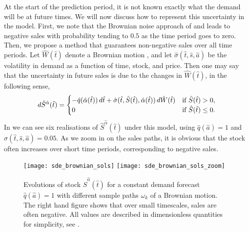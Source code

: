 \documentclass[main.tex]{subfiles}
\begin{document}
At the start of the prediction period, it is not known exactly what
the demand will be at future times. We will now discuss how to
represent this uncertainty in the model. First, we note that the Brownian noise
approach of \citet{raman1995optimal} and \citet{wu2016dynamic} leads to negative
sales with probability tending to $0.5$ as the time period goes to zero.
Then, we propose a method that guarantees non-negative sales over all
time periods.
Let $\hat{W}(\hat{t})$ denote a Brownian motion
\citep{oksendal2000stochastic}, and let
$\hat{\sigma}(\hat{t},\hat{s},\hat{a})$ be the volatility
in demand as a function of time, stock, and price. Then
one may say that the uncertainty in future
sales is due to the changes in $\hat{W}(\hat{t})$, in the following sense,
\begin{equation}\label{eq:brownian_noise}
  d\hat{S}^{\hat{\alpha}}(\hat{t}) =
  \begin{cases}
    -\hat{q}(\hat{\alpha}(\hat{t}))\,d\hat{t} +
    \hat{\sigma}(\hat{t},\hat{S}(\hat{t}),\hat{\alpha}(\hat{t}))\,d\hat{W}(\hat{t})
    & \textnormal{if } \hat{S}(\hat{t})>0,\\
    0 &  \textnormal{if } \hat{S}(\hat{t})\leq0.
  \end{cases}
\end{equation}
In  we can see six realisations of
$\hat{S}^{\hat{\alpha}}(\hat{t})$ under
this model, using $\hat{q}(\hat{a})=1$ and $\hat{\sigma}(\hat{t},\hat{s},\hat{a})=0.05$. As we zoom in on
the sales paths, it is obvious that the stock often
increases over short time periods, corresponding to negative sales.
\begin{figure}[htbp]
  \centering
  \texttt{[image: sde\_brownian\_sols]}%
  \texttt{[image: sde\_brownian\_sols\_zoom]}
  \caption[Evolutions of stock for a constant demand forecast]{Evolutions of stock $\hat{S}^{\hat{\alpha}}(\hat{t})$ for a constant
    demand forecast $\hat{q}(\hat{a})=1$ with different sample paths $\omega_k$
    of a Brownian motion.
    The right hand figure shows that over small timescales, sales are
    often negative.
    All values are described in dimensionless quantities for
    simplicity, see .
  }\label{fig:brownian_paths}
\end{figure}
\end{document}
